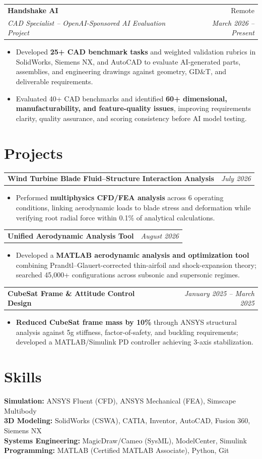 \documentclass[letterpaper,10pt]{article}
\makeatletter
\newcommand{\resumeSubheading}[4]{
\vspace{2pt}
\begin{tabular*}{\textwidth}{@{}l@{\extracolsep{\fill}}r@{}}
\textbf{#1} & #2 \\
\textit{#3} & \textit{#4} \\
\end{tabular*}\vspace{-5pt}
}
\newcommand{\resumeProjectHeading}[2]{
\vspace{2pt}
\begin{tabular*}{\textwidth}{@{}l@{\extracolsep{\fill}}r@{}}
\textbf{#1} & \textit{#2} \\[-3pt]
\end{tabular*}
\vspace{-11pt}
}
\newcommand{\resumeProjectItemListStart}{
\begin{itemize}[
leftmargin=0.17in,
itemsep=0pt,
topsep=-2pt,
parsep=0pt,
partopsep=0pt
]
}
\newcommand{\resumeProjectItemListEnd}{
\end{itemize}\vspace{0pt}
}
\newcommand{\resumeItemListStart}{
\begin{itemize}[
leftmargin=0.17in,
label=\textbullet,
itemsep=0pt,
topsep=0pt,
parsep=0pt,
partopsep=0pt
]
}
\newcommand{\resumeItemListEnd}{
\end{itemize}\vspace{-1pt}
}
\makeatother
\begin{document}
\resumeSubheading
{Handshake AI}{Remote}
{CAD Specialist -- OpenAI-Sponsored AI Evaluation Project}{March 2026 -- Present}
\resumeItemListStart
\item Developed \textbf{25+ CAD benchmark tasks} and weighted validation rubrics in SolidWorks, Siemens NX, and AutoCAD to evaluate AI-generated parts, assemblies, and engineering drawings against geometry, GD\&T, and deliverable requirements.
\item Evaluated 40+ CAD benchmarks and identified \textbf{60+ dimensional, manufacturability, and feature-quality issues}, improving requirements clarity, quality assurance, and scoring consistency before AI model testing.
\resumeItemListEnd

\section{Projects}

\resumeProjectHeading
{Wind Turbine Blade Fluid--Structure Interaction Analysis}
{July 2026}
\resumeProjectItemListStart
\item Performed \textbf{multiphysics CFD/FEA analysis} across 6 operating conditions, linking aerodynamic loads to blade stress and deformation while verifying root radial force within 0.1\% of analytical calculations.
\resumeProjectItemListEnd

\resumeProjectHeading
{Unified Aerodynamic Analysis Tool}
{August 2026}
\resumeProjectItemListStart
\item Developed a \textbf{MATLAB aerodynamic analysis and optimization tool} combining Prandtl--Glauert-corrected thin-airfoil and shock-expansion theory; searched 45,000+ configurations across subsonic and supersonic regimes.
\resumeProjectItemListEnd

\resumeProjectHeading
{CubeSat Frame \& Attitude Control Design}
{January 2025 -- March 2025}
\resumeProjectItemListStart
\item \textbf{Reduced CubeSat frame mass by 10\%} through ANSYS structural analysis against 5g stiffness, factor-of-safety, and buckling requirements; developed a MATLAB/Simulink PD controller achieving 3-axis stabilization.
\resumeProjectItemListEnd

\section{Skills}

\vspace{+3pt}
\small

\textbf{Simulation:}
ANSYS Fluent (CFD), ANSYS Mechanical (FEA), Simscape Multibody \\

\textbf{3D Modeling:}
SolidWorks (CSWA), CATIA, Inventor, AutoCAD, Fusion 360, Siemens NX \\

\textbf{Systems Engineering:}
MagicDraw/Cameo (SysML), ModelCenter, Simulink \\

\textbf{Programming:}
MATLAB (Certified MATLAB Associate), Python, Git
\end{document}
